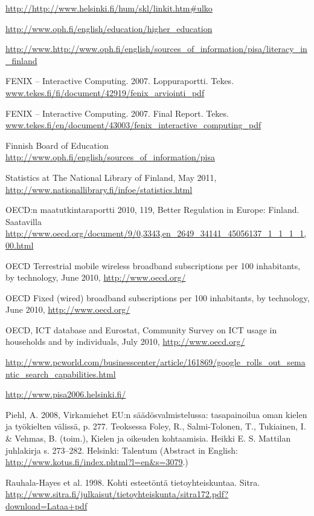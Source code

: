 \documentclass[]{../../metanetpaper}
\begin{document}
\begin{thebibliography}{102}
\url{http://http://www.helsinki.fi/hum/skl/linkit.htm#ulko}

\url{http://www.oph.fi/english/education/higher_education}

\url{http://www.http://www.oph.fi/english/sources_of_information/pisa/literacy_in_finland}

FENIX -- Interactive Computing. 2007. Loppuraportti. Tekes.
\url{www.tekes.fi/fi/document/42919/fenix_arviointi_pdf}

FENIX -- Interactive Computing. 2007. Final Report. Tekes.
\url{www.tekes.fi/en/document/43003/fenix_interactive_computing_pdf}

Finnish Board of Education
\url{http://www.oph.fi/english/sources_of_information/pisa}

Statistics at The National Library of Finland, May 2011,
\url{http://www.nationallibrary.fi/infoe/statistics.html}

OECD:n maatutkintaraportti 2010, 119, Better Regulation in Europe:
Finland. Saatavilla
\url{http://www.oecd.org/document/9/0,3343,en_2649_34141_45056137_1_1_1_1,00.html}

OECD Terrestrial mobile wireless broadband subscriptions per 100 inhabitants,
by technology, June 2010, \url{http://www.oecd.org/}

OECD Fixed (wired) broadband subscriptions per 100 inhabitants, by
technology, June 2010, \url{http://www.oecd.org/}

OECD, ICT database and Eurostat, Community Survey on ICT usage in households
and by individuals, July 2010, \url{http://www.oecd.org/}

\url{http://www.pcworld.com/businesscenter/article/161869/google_rolls_out_semantic_search_capabilities.html}

\url{http://www.pisa2006.helsinki.fi/}

Piehl, A. 2008, Virkamiehet EU:n säädösvalmistelussa: tasapainoilua oman
kielen ja työkielten välissä, p. 277. Teoksessa Foley, R., Salmi-Tolonen, T.,
Tukiainen, I. \& Vehmas, B. (toim.), Kielen ja oikeuden kohtaamisia. Heikki E.
S. Mattilan juhlakirja s. 273–282. Helsinki: Talentum (Abstract in English:
\url{http://www.kotus.fi/index.phtml?l=en&s=3079}.)

Rauhala-Hayes et al. 1998. Kohti esteetöntä tietoyhteiskuntaa. Sitra.
\url{http://www.sitra.fi/julkaisut/tietoyhteiskunta/sitra172.pdf?download=Lataa+pdf}


\end{thebibliography}
\end{document}
